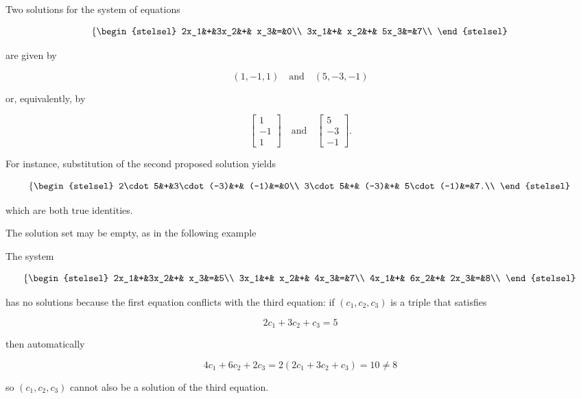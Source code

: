 \begin{ex}
\label{Ex:LinSystems:SolutionOfLinearSystem}
Two solutions for the system of equations

$$

   \left\{
\begin{stelsel}
      2x_1&+&3x_2&+&  x_3&=&0\\
      3x_1&+& x_2&+& 5x_3&=&7\\
   \end{stelsel}\right.
$$

are  given by

$$

  (1, -1, 1)    \quad \text{and} \quad (5, -3, -1)
$$

or, equivalently, by 

$$

  
\begin{bmatrix} 1\\-1\\1 \end{bmatrix}    \quad \text{and} \quad 
    
\begin{bmatrix} 5\\-3\\-1 \end{bmatrix}.
$$

For instance,  substitution of the second proposed solution yields

$$

  \left\{
\begin{stelsel}
    2\cdot 5&+&3\cdot(-3)&+&  (-1)&=&0\\
    3\cdot 5&+& (-3)&+& 5\cdot(-1)&=&7.\\
  \end{stelsel}\right.
$$

which are both true identities.\\
\end{ex}

The solution set may be empty, as in the following example

\begin{ex}
\label{Ex:LinSystems:EmptySolutionSet}
The system

$$

   \left\{
\begin{stelsel}
    2x_1&+&3x_2&+&  x_3&=&5\\
    3x_1&+& x_2&+& 4x_3&=&7\\
    4x_1&+& 6x_2&+& 2x_3&=&8\\
    \end{stelsel}\right.
$$

has no solutions because the first equation conflicts with the third equation:
if $(c_1,c_2,c_3)$ is a triple that satisfies 

$$

  2c_1 + 3c_2 + c_3 = 5
$$

then automatically

$$

  4c_1 + 6c_2 + 2c_3 = 2(2c_1 + 3c_2 + c_3) = 10 \neq 8
$$

so $(c_1,c_2,c_3)$ cannot also be a solution of the third equation.
\end{ex}

